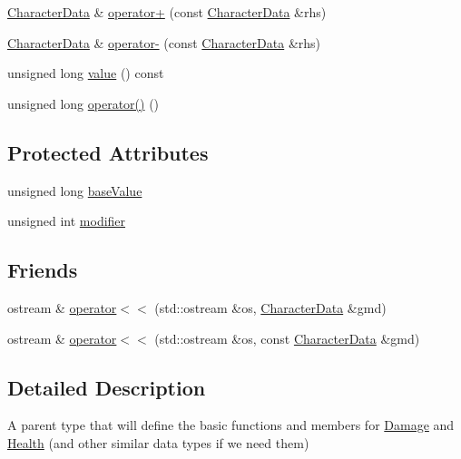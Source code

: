 \begin{DoxyCompactItemize}
\item 
\hyperlink{struct_character_data}{Character\-Data} \& \hyperlink{struct_character_data_a85313590521d86ff18bfcb6a653919e6}{operator+} (const \hyperlink{struct_character_data}{Character\-Data} \&rhs)
\item 
\hyperlink{struct_character_data}{Character\-Data} \& \hyperlink{struct_character_data_afa94ff26fee5818c3603444600ed37b9}{operator-\/} (const \hyperlink{struct_character_data}{Character\-Data} \&rhs)
\item 
unsigned long \hyperlink{struct_character_data_a65eb0fdcbb3ccab7f1b685df11161a1e}{value} () const 
\item 
unsigned long \hyperlink{struct_character_data_a55c28ca84668020f8e9df060c9e5effc}{operator()} ()
\end{DoxyCompactItemize}
\subsection*{Protected Attributes}
\begin{DoxyCompactItemize}
\item 
unsigned long \hyperlink{struct_character_data_a86c73102954363266a65ee283ff63c02}{base\-Value}
\item 
unsigned int \hyperlink{struct_character_data_adc89389cfd62de262b8fa380703a8705}{modifier}
\end{DoxyCompactItemize}
\subsection*{Friends}
\begin{DoxyCompactItemize}
\item 
ostream \& \hyperlink{struct_character_data_ac3bffef95c1ca2d8be9c0b197dcd383d}{operator$<$$<$} (std\-::ostream \&os, \hyperlink{struct_character_data}{Character\-Data} \&gmd)
\item 
ostream \& \hyperlink{struct_character_data_a662f4fb97ebcbf9be2a543877e6b95ae}{operator$<$$<$} (std\-::ostream \&os, const \hyperlink{struct_character_data}{Character\-Data} \&gmd)
\end{DoxyCompactItemize}


\subsection{Detailed Description}
A parent type that will define the basic functions and members for \hyperlink{struct_damage}{Damage} and \hyperlink{struct_health}{Health} (and other similar data types if we need them) 

